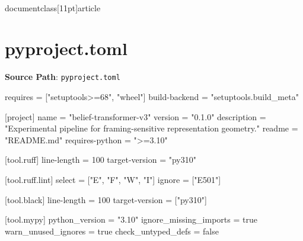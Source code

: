 \\documentclass[11pt]{article}
\begin{document}
\section*{pyproject.toml}
\textbf{Source Path}: \texttt{pyproject.toml}\par
\bigskip
\begin{CodeBlock}
requires = ["setuptools>=68", "wheel"]
build-backend = "setuptools.build_meta"

[project]
name = "belief-transformer-v3"
version = "0.1.0"
description = "Experimental pipeline for framing-sensitive representation geometry."
readme = "README.md"
requires-python = ">=3.10"

[tool.ruff]
line-length = 100
target-version = "py310"

[tool.ruff.lint]
select = ["E", "F", "W", "I"]
ignore = ["E501"]

[tool.black]
line-length = 100
target-version = ["py310"]

[tool.mypy]
python_version = "3.10"
ignore_missing_imports = true
warn_unused_ignores = true
check_untyped_defs = false

\end{CodeBlock}
\end{document}
